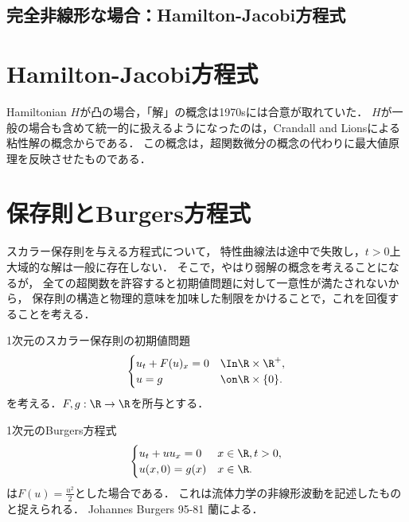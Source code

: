 \documentclass[uplatex,dvipdfmx]{jsreport}
\begin{document}
\subsection{完全非線形な場合：Hamilton-Jacobi方程式}

\section{Hamilton-Jacobi方程式}

\begin{history}
    Hamiltonian $H$が凸の場合，「解」の概念は1970sには合意が取れていた．
    $H$が一般の場合も含めて統一的に扱えるようになったのは，Crandall and Lionsによる粘性解の概念からである．
    この概念は，超関数微分の概念の代わりに最大値原理を反映させたものである．
\end{history}

\section{保存則とBurgers方程式}

\begin{tcolorbox}[colframe=ForestGreen, colback=ForestGreen!10!white,breakable,colbacktitle=ForestGreen!40!white,coltitle=black,fonttitle=\bfseries\sffamily,
title=]
    スカラー保存則を与える方程式について，
    特性曲線法は途中で失敗し，$t>0$上大域的な解は一般に存在しない．
    そこで，やはり弱解の概念を考えることになるが，
    全ての超関数を許容すると初期値問題に対して一意性が満たされないから，
    保存則の構造と物理的意味を加味した制限をかけることで，これを回復することを考える．
\end{tcolorbox}

\begin{problem}\label{prob-conservation-law}
    1次元のスカラー保存則の初期値問題
    \[\begin{cases}
        u_t+F(u)_x=0&\In\R\times\R^+,\\
        u=g&\on\R\times\{0\}.
    \end{cases}\]
    を考える．$F,g:\R\to\R$を所与とする．
\end{problem}
\begin{example}[Burgers方程式]
    1次元のBurgers方程式
    \[\begin{cases}
        u_t+uu_x=0&x\in\R,t>0,\\
        u(x,0)=g(x)&x\in\R.
    \end{cases}\]
    は$F(u)=\frac{u^2}{2}$とした場合である．
    これは流体力学の非線形波動を記述したものと捉えられる．
    Johannes Burgers 95-81 蘭による．
\end{example}
\end{document}

